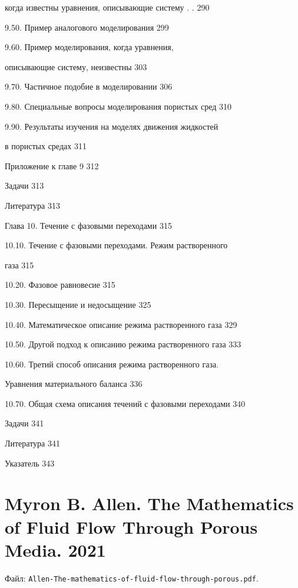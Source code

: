 \documentclass[
  11pt,
]{article}
\begin{document}
когда известны уравнения, описывающие систему . . 290 \par
9.50. Пример аналогового моделирования 299 \par
9.60. Пример моделирования, когда уравнения,  \par
описывающие систему, неизвестны 303 \par
9.70. Частичное подобие в моделировании 306 \par
9.80. Специальные вопросы моделирования пористых сред 310 \par
9.90. Результаты изучения на моделях движения жидкостей \par
в пористых средах 311 \par
Приложение к главе 9 312 \par
Задачи 313 \par
Литература 313 \par
Глава 10. Течение с фазовыми переходами 315 \par
10.10. Течение с фазовыми переходами. Режим растворенного \par
газа 315 \par
10.20. Фазовое равновесие 315 \par
10.30. Пересыщение и недосыщение 325 \par
10.40. Математическое описание режима растворенного газа 329 \par
10.50. Другой подход к описанию режима растворенного газа 333 \par
10.60. Третий способ описания режима растворенного газа. \par
Уравнения материального баланса 336 \par
10.70. Общая схема описания течений с фазовыми переходами 340 \par
Задачи 341 \par
Литература 341 \par
Указатель 343\par
\endgroup


\section{Myron B. Allen. The Mathematics of Fluid Flow Through Porous Media. 2021}\label{section-13}

Файл: \texttt{Allen-The-mathematics-of-fluid-flow-through-porous.pdf}.
\end{document}
